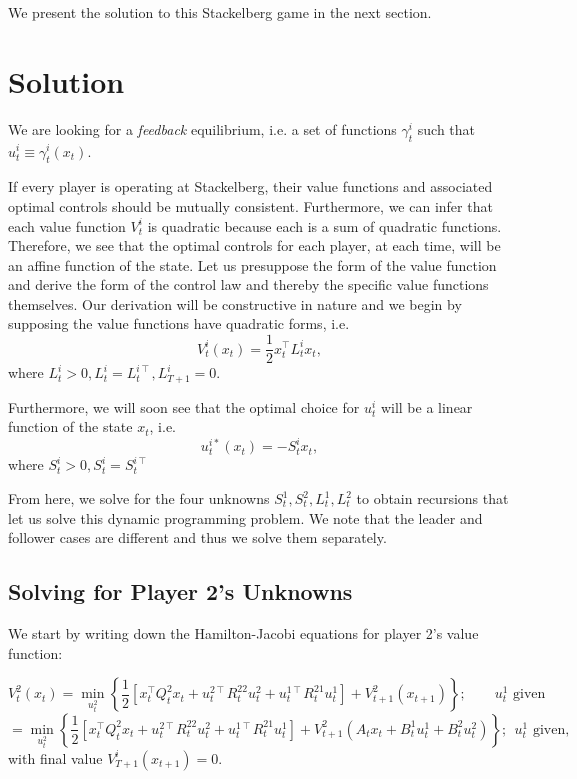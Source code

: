 \documentclass[11pt]{article}
\newcommand{\T}{\intercal}
\begin{document}
We present the solution to this Stackelberg game in the next section.

\section{Solution}
We are looking for a \emph{feedback} equilibrium, i.e. a set of functions $\gamma^i_t$ such that $u^i_t \equiv \gamma^i_t(x_t)$.

If every player is operating at Stackelberg, their value functions and associated optimal controls should be mutually consistent. Furthermore, we can infer that each value function $V^i_t$ is quadratic because each is a sum of quadratic functions. Therefore, we see that the optimal controls for each player, at each time, will be an affine function of the state. Let us presuppose the form of the value function and derive the form of the control law and thereby the specific value functions themselves. Our derivation will be constructive in nature and we begin by supposing the value functions have quadratic forms, i.e.
\begin{equation}
\label{eq:value-fn}
V^i_t(x_t) = \frac{1}{2} x^\T_t L^i_t x_t,
\end{equation}
where $L^i_t > 0, L^{i}_t = L^{i\T}_t, L^i_{T+1} = 0$.

Furthermore, we will soon see that the optimal choice for $u^i_t$ will be a linear function of the state $x_t$, i.e.
\begin{equation}
\label{eq:control-fn}
u^{i*}_t(x_t) = -S^i_t x_t,
\end{equation}
where $S^i_t > 0, S^i_t = S^{i\T}_t$

From here, we solve for the four unknowns $S^1_t, S^2_t, L^1_t, L^2_t$ to obtain recursions that let us solve this dynamic programming problem. We note that the leader and follower cases are different and thus we solve them separately.


\subsection{Solving for Player 2's Unknowns}
\label{ssec:solving-p2-unknowns}
We start by writing down the Hamilton-Jacobi equations for player 2's value function:

\begin{equation}
\label{eq:p2-hamilton-jacobi-eq}
V^2_t(x_{t}) = \min_{u^2_t} \left\{ \frac{1}{2} \left[ x_t^\T Q^2_t x_t + u^{2\T}_t R^{22}_t u^2_t + u^{1\T}_t R^{21}_t u^1_t \right] + V^2_{t+1}(x_{t+1}) \right\}; ~~~~~~~~~ u^1_t \text{ given}
\end{equation}
\begin{equation}
\label{eq:p2-hamilton-jacobi-eq-expanded}
= \min_{u^2_t} \left\{ \frac{1}{2} \left[ x_t^\T Q^2_t x_t + u^{2\T}_t R^{22}_t u^2_t + u^{1\T}_t R^{21}_t u^1_t \right] + V^2_{t+1}(A_t x_t + B^{1}_t u^{1}_t + B^{2}_t u^{2}_t) \right\}; ~~ u^1_t \text{ given},
\end{equation}
with final value $V^i_{T+1}(x_{t+1}) = 0$.
\end{document}
